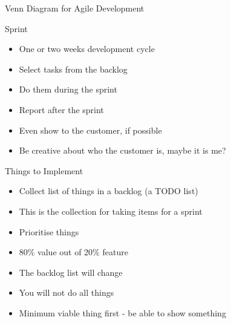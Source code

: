 \begin{frame}[fragile]{Venn Diagram for Agile Development}
\end{frame}

\begin{frame}[fragile]{Sprint}
\begin{itemize}
\item One or two weeks development cycle
\item Select tasks from the backlog
\item Do them during the sprint
\item Report after the sprint
\item Even show to the customer, if possible
\item Be creative about who the customer is, maybe it is me?
\end{itemize}
\end{frame}



\begin{frame}[fragile]{Things to Implement}
\begin{itemize}
\item Collect list of things in a backlog (a TODO list)
\item This is the collection for taking items for a sprint
\item Prioritise things
\item 80\% value out of 20\% feature
\item The backlog list will change
\item You will not do all things
\item Minimum viable thing first - be able to show something
\end{itemize}
\end{frame}

